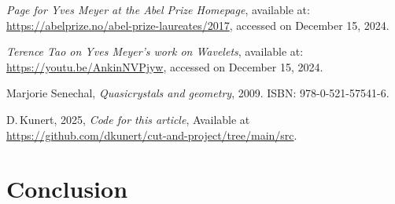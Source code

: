 \documentclass[11pt]{article}
\theoremstyle{remark}
\begin{document}
\begin{thebibliography}{99}

\emph{Page for Yves Meyer at the Abel Prize Homepage}, available at: 
\url{https://abelprize.no/abel-prize-laureates/2017}, accessed on December 15, 2024.

\emph{Terence Tao on Yves Meyer's work on Wavelets}, available at: 
\url{https://youtu.be/AnkinNVPjyw}, accessed on December 15, 2024.


Marjorie Senechal,
\emph{Quasicrystals and geometry},
2009.
ISBN: 978-0-521-57541-6.

%
D.\,Kunert, 2025,
\emph{Code for this article},
Available at \url{https://github.com/dkunert/cut-and-project/tree/main/src}.\\

\end{thebibliography}

\section{Conclusion}
\end{document}
